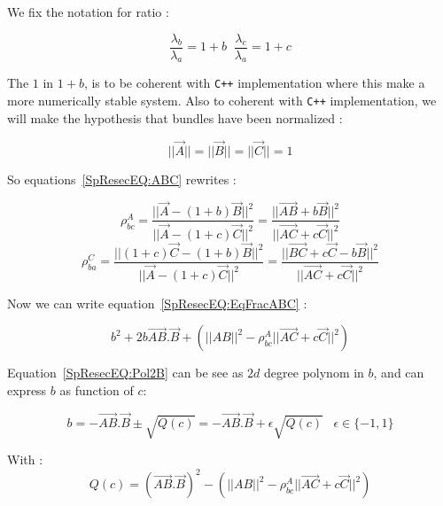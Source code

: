 We fix the notation for ratio :

\begin{equation}
	\frac{\lambda_{b}}{\lambda_{a}} = 1+ b  \;\;
	\frac{\lambda_{c}}{\lambda_{a}} = 1+ c
\end{equation}


The $1$ in $1+b$, is to be coherent with {\tt C++} implementation where this make a more numerically stable system.
Also to coherent with {\tt C++} implementation, we will make the hypothesis that bundles have been normalized :

\begin{equation}
	|| \Vec{A}|| = || \Vec{B}|| = || \Vec{C}|| = 1
\end{equation}

So equations~\ref{SpResecEQ:ABC} rewrites :

\begin{equation}
	\rho^A_{bc}  
	= \frac{|| \Vec{A} -  (1+b) \Vec{B} ||^2 }{||\Vec{A} - (1+c) \Vec{C}||^2}
	= \frac{|| \overrightarrow{AB} +  b \Vec{B} ||^2 }{||\overrightarrow{AC}  + c \Vec{C}||^2}  \label{SpResecEQ:EqFracABC}
\end{equation}
\begin{equation}
	\rho^C_{ba}  
	= \frac{|| (1+c) \Vec{C} -  (1+b) \Vec{B} ||^2 } {||\Vec{A} -  (1+c) \Vec{C}||^2}
	= \frac{|| \overrightarrow{BC} + c \Vec{C} -  b \Vec{B} ||^2 } {||\overrightarrow{AC}  + c \Vec{C}||^2}
	 \label{SpResecEQ:EqFracCBA}
\end{equation}

Now we can write equation~\ref{SpResecEQ:EqFracABC} :

\begin{equation}
	b^2 + 2 b \overrightarrow{AB}. \Vec{B} + (||AB||^2 -   \rho^A_{bc} ||\overrightarrow{AC}  + c \Vec{C}||^2)
	\label{SpResecEQ:Pol2B}
\end{equation}

Equation~\ref{SpResecEQ:Pol2B} can be see as $2d$ degree polynom in $b$, and can express $b$ as function of $c$:

\begin{equation}
	b = -\overrightarrow{AB}. \Vec{B} \pm \sqrt{Q(c)}  = -\overrightarrow{AB}. \Vec{B} + \epsilon \sqrt{Q(c)} 
	 \;\;\;  \epsilon \in \{-1,1\}  \label{SpResecEQ:SolEqD2}
\end{equation}

With :
\begin{equation}
	Q(c) = (\overrightarrow{AB}. \Vec{B})^2 -  (||AB||^2 -   \rho^A_{bc} ||\overrightarrow{AC}  + c \Vec{C}||^2)
\end{equation}

